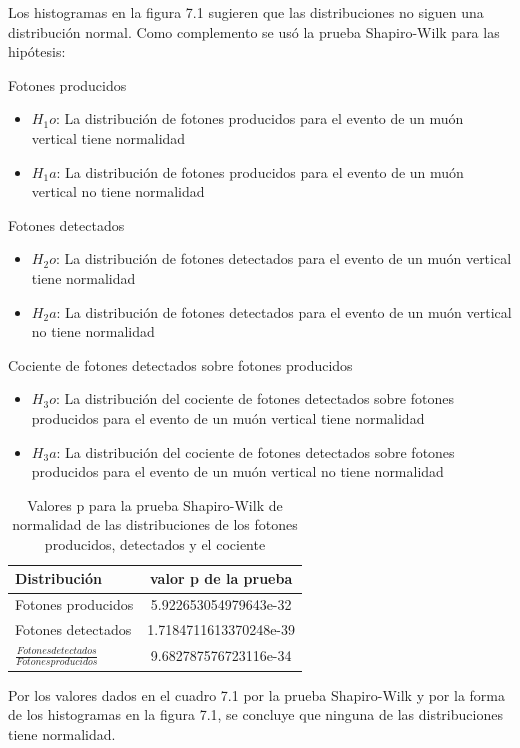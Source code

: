 \documentclass{book}
\begin{document}
Los histogramas en la figura 7.1 sugieren que las distribuciones no siguen una distribuci\'on normal. Como complemento se us\'o la prueba Shapiro-Wilk para las hip\'otesis:

Fotones producidos
\begin{itemize}
\item $H_1o$: La distribuci\'on de fotones producidos para el evento de un mu\'on vertical tiene normalidad
\item $H_1a$: La distribuci\'on de fotones producidos para el evento de un mu\'on vertical no tiene normalidad
\end{itemize}

Fotones detectados
\begin{itemize}
\item $H_2o$: La distribuci\'on de fotones detectados para el evento de un mu\'on vertical tiene normalidad
\item $H_2a$: La distribuci\'on de fotones detectados para el evento de un mu\'on vertical no tiene normalidad
\end{itemize}

Cociente de fotones detectados sobre fotones producidos
\begin{itemize}
\item $H_3o$: La distribuci\'on del cociente de fotones detectados sobre fotones producidos para el evento de un mu\'on vertical tiene normalidad
\item $H_3a$: La distribuci\'on del cociente de fotones detectados sobre fotones producidos para el evento de un mu\'on vertical no tiene normalidad
\end{itemize}

\begin{table}[h]
\caption{ Valores p para la prueba Shapiro-Wilk de normalidad de las distribuciones de los fotones producidos, detectados y el cociente}
\centering
\begin{tabular}{l | c}
\hline
Distribuci\'on & valor p de la prueba \\ \hline
Fotones producidos & 5.922653054979643e-32 \\
Fotones detectados & 1.7184711613370248e-39 \\
$\frac{Fotones detectados}{Fotones producidos}$ & 9.682787576723116e-34 \\

\hline
\end{tabular}
\end{table}

Por los valores dados en el cuadro 7.1 por la prueba Shapiro-Wilk y por la forma de los histogramas en la figura 7.1, se concluye que ninguna de las distribuciones tiene normalidad.
\end{document}
